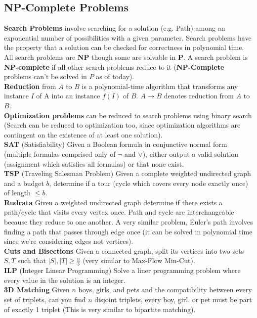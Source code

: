 \documentclass{article}
\begin{document}
\begin{multicols}{2}
\section*{NP-Complete Problems}
\textbf{Search Problems} involve searching for a solution (e.g. Path) among an exponential number of possibilities with a given parameter. Search problems have the property that a solution can be checked for correctness in polynomial time. All search problems are \textbf{NP} though some are solvable in \textbf{P}. A search problem is \textbf{NP-complete} if all other search problems reduce to it (\textbf{NP-Complete} problems can't be solved in $P$ as of today). \\
\textbf{Reduction} from $A$ to $B$ is a polynomial-time algorithm that transforms any instance $I$ of A into an instance $f(I)$ of $B$. $A \rightarrow B$ denotes reduction from $A$ to $B$. \\
\textbf{Optimization problems} can be reduced to search problems using binary search (Search can be reduced to optimization too, since optimization algorithms are contingent on the existence of at least one solution). \\
\textbf{SAT} (Satisfiability) Given a Boolean formula in conjunctive normal form (multiple formulas comprised only of $\neg$ and $\vee$), either output a valid solution (assignment which satisfies all formulas) or that none exist. \\
\textbf{TSP} (Traveling Salesman Problem) Given a complete weighted undirected graph and a budget $b$, determine if a tour (cycle which covers every node exactly once) of length $\leq b$.\\
\textbf{Rudrata} Given a weighted undirected graph determine if there exists a path/cycle that visits every vertex once. Path and cycle are interchangeable because they reduce to one another. A very similar problem, Euler's path involves finding a path that passes through edge once (it can be solved in polynomial time since we're considering edges not vertices). \\
\textbf{Cuts and Bisections} Given a connected graph, split its vertices into two sets $S, T$ such that $|S|, |T| \geq \frac{n}{3}$ (very similar to Max-Flow Min-Cut). \\
\textbf{ILP} (Integer Linear Programming) Solve a liner programming problem where every value in the solution is an integer.\\
\textbf{3D Matching} Given $n$ boys, girls, and pets and the compatibility between every set of triplets, can you find $n$ disjoint triplets, every boy, girl, or pet must be part of exactly 1 triplet (This is very similar to bipartite matching).  \\

\end{multicols}
\end{document}

